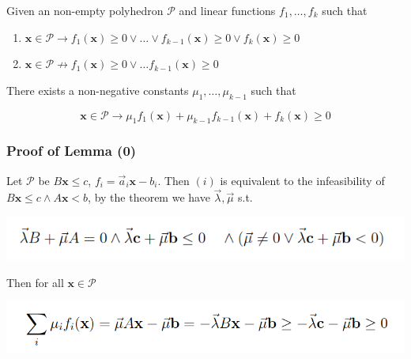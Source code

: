 \documentclass[11pt]{beamer}
\begin{document}
\begin{frame}
\begin{lemma}[0]
Given an non-empty polyhedron $\mathcal{P}$ and linear functions $f_1, \ldots , f_k$ such that 

\begin{enumerate}
\item $\textbf{x}\in \mathcal{P}\rightarrow f_1(  \textbf{x}) \ge 0 \vee \ldots \vee f_{k-1}(\textbf{x}) \ge 0 \vee f_{k}(\textbf{x}) \ge 0$

\item $\textbf{x} \in \mathcal{P} \not\rightarrow f_1(\textbf{x}) \ge 0 \vee \ldots f_{k-1}(\textbf{x}) \ge 0$

\end{enumerate}
There exists a non-negative constants $\mu_1, \ldots, \mu_{k-1}$ such that 

\[\textbf{x}\in \mathcal{P} \rightarrow \mu_1f_1(\textbf{x}) + \mu_{k-1}f_{k-1}(\textbf{x}) + f_k(\textbf{x}) \ge 0\]
\end{lemma}


\end{frame}
\begin{frame}\frametitle{Proof of Lemma (0)}
Let $\mathcal{P}$ be $B\textbf{x} \le c$, $f_i = \vec{a}_i \textbf{x} - b_i$.
Then $(i)$ is equivalent to the infeasibility of $B\textbf{x} \le c \wedge A\textbf{x} < b$, by the theorem we have $\vec{\lambda}, \vec{\mu}$ s.t.

\begin{center}
\includegraphics[scale=0.45]{11.png}
\end{center}
Then for all $\textbf{x}\in \mathcal{P}$
\begin{center}
\includegraphics[scale=0.35]{12.png}
\end{center}
\end{frame}
\end{document}

